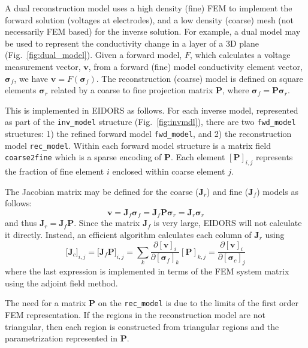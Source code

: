 \documentclass[12pt,draft]{iopart}
\newcommand{\vB}{\mbox{$\mathbf{v}$}}
\newcommand{\JB}{\mbox{$\mathbf{J}$}}
\renewcommand{\PB}{\mbox{$\mathbf{P}$}}
\newcommand{\sG}{\mbox{${\boldsymbol \sigma}$}}
\begin{document}
A dual reconstruction model uses a high density (fine)
FEM to implement the forward solution (voltages
at electrodes), and a low density (coarse) mesh
(not necessarily FEM based) for the inverse
solution. For example, a dual model may be used to 
represent the conductivity change in a layer
of a 3D plane (Fig.~\ref{fig:dual_model}).
Given a forward model, $F$,
which calculates a voltage measurement vector, $\vB$, from
a forward (fine) model conductivity element vector, $\sG_f$, we
have $\vB = F( \sG_f )$. The reconstruction (coarse)
model is defined on square elements $\sG_r$ related by
a coarse to fine projection matrix $\PB$, where $\sG_f = \PB \sG_r$.

This is implemented in EIDORS as follows. For each
inverse model, represented as part of the {\tt inv\_model}
structure (Fig.~\ref{fig:invmdl}),
there are two {\tt fwd\_model} structures:
1) the refined forward model {\tt fwd\_model}, and
2) the reconstruction model {\tt rec\_model}. 
Within each forward model structure is a matrix field
{\tt coarse2fine} which is a sparse encoding of $\PB$.
Each element $[\PB]_{i,j}$ represents the fraction of
fine element $i$ enclosed within coarse element $j$.

The Jacobian matrix may be defined for the coarse
($\JB_r$) and fine ($\JB_f$) models as follows:
\begin{equation}
\vB = \JB_f \sG_f 
    = \JB_f \PB \sG_r
    = \JB_r     \sG_r
\end{equation}
and thus $\JB_r = \JB_f \PB$. Since the matrix
$\JB_f$ is very large, EIDORS will not calculate it
directly. Instead, an efficient algorithm calculates
each column of $\JB_r$ using
\begin{equation}
\big[ \JB_c \big]_{i,j} =
\big[ \JB_f \PB \big]_{i,j} =
\sum_k \frac{\partial [ \vB ]_i }
            {\partial [ \sG_f ]_k } [\PB]_{k,j}
= \frac{\partial [ \vB ]_i }
       {\partial [ \sG_c ]_j }
\end{equation}
where the last expression is implemented in terms
of the FEM system matrix using the adjoint field method.

The need for a matrix $\PB$ on the {\tt rec\_model} is
due to the limits of the first order FEM representation.
If the regions in the reconstruction model are not
triangular, then each region is constructed from triangular
regions and the parametrization represented in $\PB$.
\end{document}
